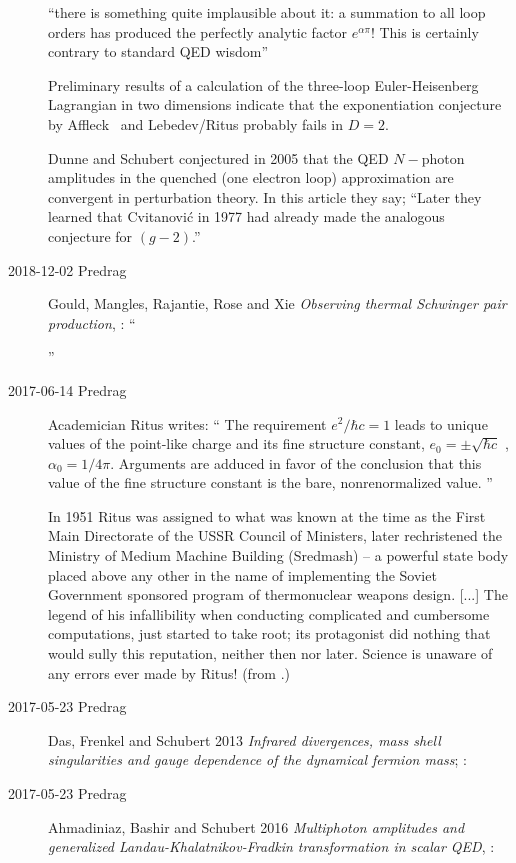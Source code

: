 \begin{description}
``there is something quite implausible about it: a summation to all loop
orders has produced the perfectly analytic factor $e^{\alpha\pi}$! This is
certainly contrary to standard QED wisdom''

Preliminary results of a calculation of the three-loop Euler-Heisenberg
Lagrangian in two dimensions indicate that the exponentiation conjecture
by Affleck \etal\ and Lebedev/Ritus probably fails in $D = 2$.

Dunne and Schubert conjectured in 2005 that the QED $N-$photon amplitudes
in the quenched (one electron loop) approximation are convergent in
perturbation theory. In this article they say; ``Later they learned
that Cvitanovi\'c in 1977 had already made the analogous conjecture for
$(g-2)$.''

\item[2018-12-02 Predrag]
Gould, Mangles, Rajantie, Rose and Xie {\em Observing thermal
{Schwinger} pair production}, : ``

''

\item[2017-06-14 Predrag]
Academician Ritus writes: ``
The requirement  {$ e^{2}/\hbar c = 1$} leads to unique values of the
point-like charge and its fine structure constant, {$ e_{0} = \pm
\sqrt{\hbar c}$} , {$ \alpha_{0} = 1/4 \pi$}. Arguments are adduced in
favor of the conclusion that this value of the fine structure constant is
the bare, nonrenormalized value.
''

In 1951 Ritus was assigned to what was known at the time as the First Main
Directorate of the USSR Council of Ministers, later rechristened the
Ministry of Medium Machine Building (Sredmash) -- a powerful state body
placed above any other in the name of implementing the Soviet Government
sponsored program of thermonuclear weapons design. [...]
The legend of his infallibility when conducting complicated and
cumbersome computations, just started to take root; its protagonist did
nothing that would sully this reputation, neither then nor later. Science
is unaware of any errors ever made by Ritus! (from .)

\item[2017-05-23 Predrag]

Das, Frenkel and Schubert 2013
{\em Infrared divergences, mass shell singularities and gauge dependence
of the dynamical fermion mass};
 :

\item[2017-05-23 Predrag]
Ahmadiniaz, Bashir and Schubert 2016
{\em Multiphoton amplitudes and generalized {Landau-Khalatnikov-Fradkin}
transformation in scalar {QED}},  	:


\end{description}

